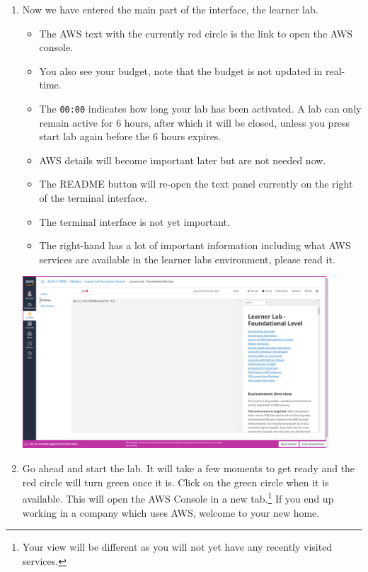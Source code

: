 \documentclass{csse4400}
\begin{document}
\begin{enumerate}
\item Now we have entered the main part of the interface, the learner lab.
\begin{itemize}
      \item The AWS text with the currently red circle is the link to open the AWS console.
      \item You also see your budget, note that the budget is not updated in real-time.
      \item The \texttt{00:00} indicates how long your lab has been activated.
      A lab can only remain active for 6 hours, after which it will be closed, unless you press start lab again before the 6 hours expires.
      \item AWS details will become important later but are not needed now.
      \item The README button will re-open the text panel currently on the right of the terminal interface.
      \item The terminal interface is not yet important.
      \item The right-hand has a lot of important information including what AWS services are available in the learner labs environment, please read it.
\end{itemize}

\includegraphics[width=0.9\textwidth]{images/lab-interface}

\item Go ahead and start the lab. It will take a few moments to get ready and the red circle will turn green once it is.
      Click on the green circle when it is available.
      This will open the AWS Console in a new tab.\footnote{Your view will be different as you will not yet have any recently visited services.}
      If you end up working in a company which uses AWS, welcome to your new home.



\end{enumerate}
\end{document}
